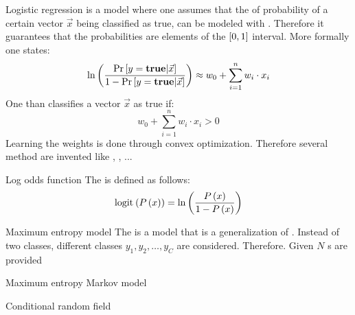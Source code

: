 \begin{df}{Logistic regression}
\sb{} is a model where one assumes that the  of probability of a certain vector $\vec{x}$ being classified as true, can be modeled with . Therefore it guarantees that the probabilities are elements of the $\left[0,1\right]$ interval. More formally one states:
\begin{equation}
\ln\left(\displaystyle\frac{\Pr\left[y=\mbox{\textbf{true}}{}|\vec{x}\right]}{1-\Pr\left[y=\mbox{\textbf{true}}{}|\vec{x}\right]}\right)\approx w_0+\displaystyle\sum_{i=1}^{n}w_i\cdot x_i
\end{equation}
One than classifies a vector $\vec{x}$ as true if:
\begin{equation}
w_0+\displaystyle\sum_{i=1}^{n}w_i\cdot x_i>0
\end{equation}
Learning the weights is done through convex optimization. Therefore several method are invented like , , ...
\end{df}
\begin{df}[Logit]{Log odds function}
The \sb{} is defined as follows:
\begin{equation}
\mbox{logit}_{}\left(P\left(x\right)\right)=\ln\left(\displaystyle\frac{P\left(x\right)}{1-P\left(x\right)}\right)
\end{equation}
\end{df}
\begin{df}{Maximum entropy model}
The \sb{} is a model that is a generalization of . Instead of two classes, different classes $y_1,y_2,\ldots,y_C$ are considered. Therefore. Given $N$ s are provided
\end{df}
\begin{df}[MEMM]{Maximum entropy Markov model}

\end{df}
\begin{df}[CRF]{Conditional random field}

\end{df}